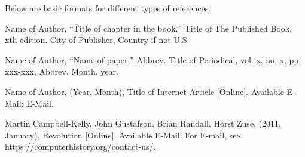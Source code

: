 \documentclass[letterpaper, 10 pt, conference]{IEEEconf}
\begin{document}
Below are basic formats for different types of references.

\begin{enumerate}[label={[\arabic*]}]
\item Name of Author, ``Title of chapter in the book,''
Title of The Published Book, xth edition. City of
Publisher, Country if not U.S.
\item Name of Author, “Name of paper,” Abbrev.
Title of Periodical, vol. x, no. x, pp. xxx-xxx,
Abbrev. Month, year.
\item Name of Author, (Year, Month),
Title of Internet Article [Online]. Available E-Mail:
E-Mail.
\item Martin Campbell-Kelly, John Gustafson, 
Brian Randall, Horst Zuse, (2011, January),
Revolution [Online]. Available E-Mail:
For E-mail, see https://computerhistory.org/contact-us/.
\end{enumerate}
\end{document}
